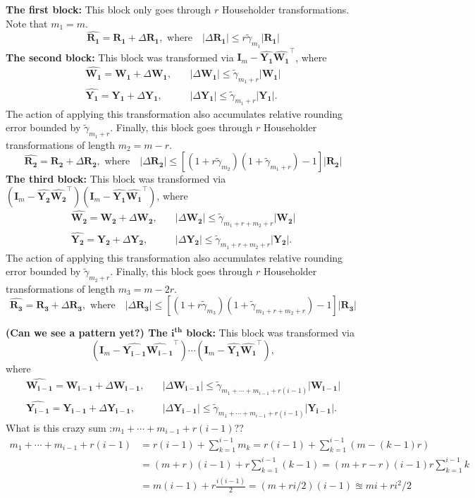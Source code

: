 \documentclass[review,onefignum,onetabnum]{siamart190516}
\newcommand{\bb}[1]{\mathbf{#1}}
\begin{document}
\textbf{The first block:} This block only goes through $r$ Householder transformations. Note that $m_1 = m$.
\[\boxed{ \hat{\bb{R_1}} = \bb{R_1}+\Delta\bb{R_1},\text{ where}\quad |\Delta\bb{R_1}| \leq r\tilde{\gamma}_{
m_1}	|\bb{R_1}| 
}\]
\textbf{The second block:} This block was transformed via $\bb{I}_m-\hat{\bb{Y_1}}\hat{{\bb{W_1}}}^{\top}$, where
\begin{align*}
 \hat{\bb{W_1}} = \bb{W_1}+\Delta\bb{W_1},\quad &  |\Delta\bb{W_1}| \leq \tilde{\gamma}_{m_1+r}|\bb{W_1}|  \\
 \hat{\bb{Y_1}} = \bb{Y_1}+\Delta\bb{Y_1},\quad &  |\Delta\bb{Y_1}| \leq \tilde{\gamma}_{m_1+r}|\bb{Y_1}|.
\end{align*}
The action of applying this transformation also accumulates relative rounding error bounded by $\tilde{\gamma}_{m_1+r}$.
Finally, this block goes through $r$ Householder transformations of length $m_2 = m-r$.
 \[\boxed{ \hat{\bb{R_2}} = \bb{R_2}+\Delta\bb{R_2},\text{ where}\quad |\Delta\bb{R_2}| \leq\left[\left(1+ r\tilde{\gamma}_{
 		m_2}\right)\left(1 + \tilde{\gamma}_{m_1+r}\right)-1\right]|\bb{R_2}| 
 }\]
\textbf{The third block:} This block was transformed via $(\bb{I}_m-\hat{\bb{Y_2}}\hat{{\bb{W_2}}}^{\top})(\bb{I}_m-\hat{\bb{Y_1}}\hat{{\bb{W_1}}}^{\top})$, where
\begin{align*}
\hat{\bb{W_2}} = \bb{W_2}+\Delta\bb{W_2},\quad &  |\Delta\bb{W_2}| \leq \tilde{\gamma}_{m_1+r +m_2+r}|\bb{W_2}|  \\
\hat{\bb{Y_2}} = \bb{Y_2}+\Delta\bb{Y_2},\quad &  |\Delta\bb{Y_2}| \leq \tilde{\gamma}_{m_1+r +m_2+r}|\bb{Y_2}|.
\end{align*}
The action of applying this transformation also accumulates relative rounding error bounded by $\tilde{\gamma}_{m_2+r}$.
Finally, this block goes through $r$ Householder transformations of length $m_3 = m-2r$.
 \[\boxed{ \hat{\bb{R_3}} = \bb{R_3}+\Delta\bb{R_3},\text{ where}\quad |\Delta\bb{R_3}| \leq\left[\left(1+ r\tilde{\gamma}_{
		m_3}\right)\left(1 + \tilde{\gamma}_{m_1+r +m_2+r}\right)-1\right]|\bb{R_3}| 
}\]

\textbf{(Can we see a pattern yet?) The $\mathbf{i^{th}}$ block: } This block was transformed via $$(\bb{I}_m-\hat{\bb{Y_{i-1}}}\hat{{\bb{W_{i-1}}}}^{\top})\cdots (\bb{I}_m-\hat{\bb{Y_1}}\hat{{\bb{W_1}}}^{\top}),$$ where
\begin{align*}
\hat{\bb{W_{i-1}}} = \bb{W_{i-1}}+\Delta\bb{W_{i-1}},\quad &  |\Delta\bb{W_{i-1}}| \leq \tilde{\gamma}_{m_1+\cdots+m_{i-1}+r(i-1)}|\bb{W_{i-1}}|  \\
\hat{\bb{Y_{i-1}}} = \bb{Y_{i-1}}+\Delta\bb{Y_{i-1}},\quad &  |\Delta\bb{Y_{i-1}}| \leq \tilde{\gamma}_{m_1+\cdots+m_{i-1}+r(i-1)}|\bb{Y_{i-1}}|.
\end{align*}
What is this crazy sum :$m_1+\cdots+m_{i-1}+r(i-1)$??
\begin{align*}
	m_1+\cdots+m_{i-1}+r(i-1) &= r(i-1) + \sum_{k=1}^{i-1} m_k = r(i-1) + \sum_{k=1}^{i-1} \left(m-(k-1)r\right) \\
	&= (m+r)(i-1) + r\sum_{k=1}^{i-1} (k-1) = (m+r-r)(i-1) r\sum_{k=1}^{i-1} k\\
	&= m(i-1) + r\frac{i(i-1)}{2} = (m+ri/2)(i-1) \approxeq mi +ri^2/2
\end{align*}
\end{document}
